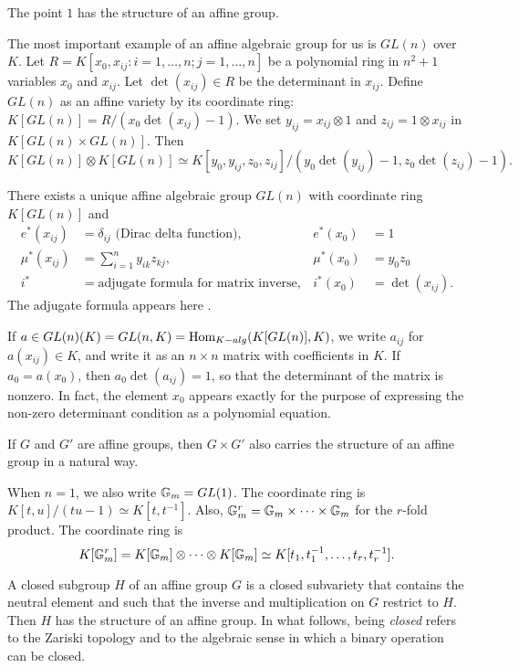 The point $1$ has the structure of an affine group.

The most important example of an affine algebraic group for us is
$GL(n)$ over $K$.  Let $R=K[x_0,x_{ij}:i=1,\ldots,n;j=1,\ldots,n]$ be
a polynomial ring in $n^2+1$ variables $x_0$ and $x_{ij}$.  Let
$\det(x_{ij})\in R$ be the determinant in $x_{ij}$.  Define $GL(n)$ as
an affine variety by its coordinate ring: $K[GL(n)] =
R/(x_0\det(x_{ij}) - 1)$.  We set $y_{ij} = x_{ij}\otimes 1$ and
$z_{ij} = 1\otimes x_{ij}$ in $K[GL(n)\times GL(n)]$.  Then
\[
K[GL(n)]\otimes K[GL(n)] \simeq
K[y_0,y_{ij},z_0,z_{ij}]/(y_0 \det(y_{ij})-1,z_0\det(z_{ij})-1).
\]

There exists a unique affine algebraic group $GL(n)$ with coordinate
ring $K[GL(n)]$ and
\begin{align*}
  e^*(x_{ij}) &= \delta_{ij} \text{ (Dirac delta function)},&e^*(x_0) &= 1\\
  \mu^*(x_{ij}) &= \sum_{i=1}^n {y_{ik} z_{kj}},&\mu^*(x_0) &= y_0 z_0\\
  i^* &= \text{adjugate formula for matrix inverse},&i^*(x_0)&=\det(x_{ij}).
\end{align*}
The adjugate formula appears here \cite{WA}.

If $a \in GL(n)(K) = GL(n,K) = \text{Hom}_{K-alg}(K[GL(n)],K)$, we write
$a_{ij}$ for $a(x_{ij})\in K$, and write it as an $n\times n$ matrix
with coefficients in $K$.  If $a_0 = a(x_0)$, then
$a_0\det(a_{ij})=1$, so that the determinant of the matrix is nonzero.
In fact, the element $x_0$ appears exactly for the purpose of
expressing the non-zero determinant condition as a polynomial
equation.

If $G$ and $G'$ are affine groups, then $G \times G'$ also
carries the structure of an affine group in a natural way.

When $n=1$, we also write ${\Bbb G}_m = GL(1)$.
The coordinate ring is $K[t,u]/(t u - 1)\simeq K[t,t^{-1}]$.
Also, ${\Bbb G}_m^r
={\Bbb G}_m \times \cdots \times {\Bbb G}_m$ for the $r$-fold product.
The coordinate ring is
\[
K[{\Bbb G}_m^r]=K[{\Bbb G}_m]\otimes\cdots\otimes K[{\Bbb G}_m]
\simeq K[t_1,t_1^{-1},\ldots,t_r,t_r^{-1}].
\]



A closed subgroup $H$ of an affine group $G$ is a closed subvariety
that contains the neutral element and such that the inverse and
multiplication on $G$ restrict to $H$.  Then $H$ has the structure of
an affine group.  In what follows, being {\it closed} refers to the
Zariski topology and to the algebraic sense in which a binary
operation can be closed.

